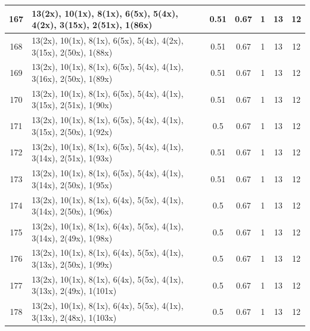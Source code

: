 \begin{small}
\begin{longtable}{|c|p{4cm}|c|c|c|c|c|}
  167 & 13(2x), 10(1x), 8(1x), 6(5x), 5(4x), 4(2x), 3(15x), 2(51x), 1(86x) & \cellcolor{colorGood}  0.51 & \cellcolor{colorGood} 0.67 & 1 & 13 & \cellcolor{colorGood} 12 \\   \hline
  168 & 13(2x), 10(1x), 8(1x), 6(5x), 5(4x), 4(2x), 3(15x), 2(50x), 1(88x) & \cellcolor{colorGood}  0.51 & \cellcolor{colorGood} 0.67 & 1 & 13 & \cellcolor{colorGood} 12 \\   \hline
  169 & 13(2x), 10(1x), 8(1x), 6(5x), 5(4x), 4(1x), 3(16x), 2(50x), 1(89x) & \cellcolor{colorGood}  0.51 & \cellcolor{colorGood} 0.67 & 1 & 13 & \cellcolor{colorGood} 12 \\   \hline
  170 & 13(2x), 10(1x), 8(1x), 6(5x), 5(4x), 4(1x), 3(15x), 2(51x), 1(90x) & \cellcolor{colorGood}  0.51 & \cellcolor{colorGood} 0.67 & 1 & 13 & \cellcolor{colorGood} 12 \\   \hline
  171 & 13(2x), 10(1x), 8(1x), 6(5x), 5(4x), 4(1x), 3(15x), 2(50x), 1(92x) & \cellcolor{colorGood}  0.5 & \cellcolor{colorGood} 0.67 & 1 & 13 & \cellcolor{colorGood} 12 \\   \hline
  172 & 13(2x), 10(1x), 8(1x), 6(5x), 5(4x), 4(1x), 3(14x), 2(51x), 1(93x) & \cellcolor{colorGood}  0.51 & \cellcolor{colorGood} 0.67 & 1 & 13 & \cellcolor{colorGood} 12 \\   \hline
  173 & 13(2x), 10(1x), 8(1x), 6(5x), 5(4x), 4(1x), 3(14x), 2(50x), 1(95x) & \cellcolor{colorGood}  0.51 & \cellcolor{colorGood} 0.67 & 1 & 13 & \cellcolor{colorGood} 12 \\   \hline
  174 & 13(2x), 10(1x), 8(1x), 6(4x), 5(5x), 4(1x), 3(14x), 2(50x), 1(96x) & \cellcolor{colorGood}  0.5 & \cellcolor{colorGood} 0.67 & 1 & 13 & \cellcolor{colorGood} 12 \\   \hline
  175 & 13(2x), 10(1x), 8(1x), 6(4x), 5(5x), 4(1x), 3(14x), 2(49x), 1(98x) & \cellcolor{colorGood}  0.5 & \cellcolor{colorGood} 0.67 & 1 & 13 & \cellcolor{colorGood} 12 \\   \hline
  176 & 13(2x), 10(1x), 8(1x), 6(4x), 5(5x), 4(1x), 3(13x), 2(50x), 1(99x) & \cellcolor{colorGood}  0.5 & \cellcolor{colorGood} 0.67 & 1 & 13 & \cellcolor{colorGood} 12 \\   \hline
  177 & 13(2x), 10(1x), 8(1x), 6(4x), 5(5x), 4(1x), 3(13x), 2(49x), 1(101x) & \cellcolor{colorGood}  0.5 & \cellcolor{colorGood} 0.67 & 1 & 13 & \cellcolor{colorGood} 12 \\   \hline
  178 & 13(2x), 10(1x), 8(1x), 6(4x), 5(5x), 4(1x), 3(13x), 2(48x), 1(103x) & \cellcolor{colorGood}  0.5 & \cellcolor{colorGood} 0.67 & 1 & 13 & \cellcolor{colorGood} 12 \\   \hline

\end{longtable}
\end{small}
